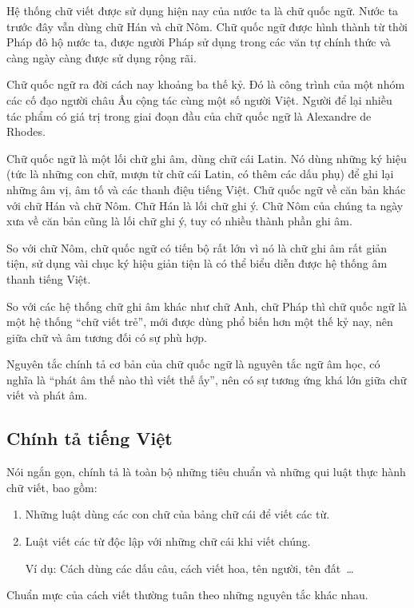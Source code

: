 \documentclass[a4paper,oneside,14pt]{extbook} %
\begin{document}
Hệ thống chữ viết được sử dụng hiện nay của nước ta là chữ quốc
ngữ. Nước ta trước đây vẫn dùng chữ Hán và chữ Nôm. Chữ quốc ngữ được
hình thành từ thời Pháp đô hộ nước ta, được người Pháp sử dụng
trong các văn tự chính thức và càng ngày càng được sử dụng rộng rãi.

Chữ quốc ngữ ra đời cách nay khoảng ba thế kỷ. Đó là công trình của
một nhóm các cố đạo người châu Âu cộng tác cùng một số người
Việt. Người để lại nhiều tác phẩm có giá trị trong giai đoạn đầu của
chữ quốc ngữ là Alexandre de Rhodes.


Chữ quốc ngữ là một lối chữ ghi âm, dùng chữ cái Latin. Nó dùng những
ký hiệu (tức là những con chữ, mượn từ chữ cái Latin, có thêm các dấu
phụ) để ghi lại những âm vị, âm tố và các thanh điệu tiếng Việt. Chữ
quốc ngữ về căn bản khác với chữ Hán và chữ Nôm. Chữ Hán là lối chữ
ghi ý. Chữ Nôm của chúng ta ngày xưa về căn bản cũng là lối chữ ghi ý,
tuy có nhiều thành phần ghi âm.

So với chữ Nôm, chữ quốc ngữ có tiến bộ rất lớn vì nó là chữ ghi âm
rất giản tiện, sử dụng vài chục ký hiệu giản tiện là có thể biểu diễn
được hệ thống âm thanh tiếng Việt.

So với các hệ thống chữ ghi âm khác như chữ Anh, chữ Pháp thì chữ quốc
ngữ là một hệ thống ``chữ viết trẻ'', mới được dùng phổ biến hơn
một thế kỷ nay, nên giữa chữ và âm tương đối có sự phù hợp.

Nguyên tắc chính tả cơ bản của chữ quốc ngữ là nguyên tắc ngữ âm học,
có nghĩa là ``phát âm thế nào thì viết thế ấy'', nên có sự tương ứng
khá lớn giữa chữ viết và phát âm.




\subsection{Chính tả tiếng Việt}


Nói ngắn gọn, chính tả là toàn bộ những tiêu chuẩn và những qui luật
thực hành chữ viết, bao gồm:
\begin{enumerate}
\item Những luật dùng các con chữ của bảng chữ cái để viết các từ.
\item Luật viết các từ độc lập với những chữ cái khi viết chúng.

  Ví dụ: Cách dùng các dấu câu, cách viết hoa, tên người, tên đất~\ldots{} 
\end{enumerate}

Chuẩn mực của cách viết thường tuân theo những nguyên tắc khác nhau.
\end{document}
